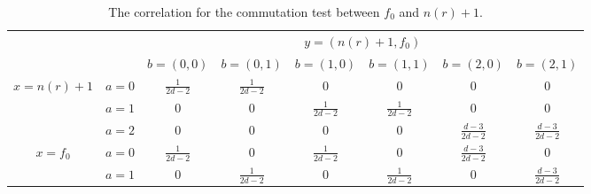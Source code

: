 \documentclass[11pt,letterpaper]{article}
\newcommand{\1}{\mathbb{1}}
\newcommand{\nr}{n(r)}
\theoremstyle{definition}
\begin{document}
\begin{table}[H]
\begin{center}
\begin{tabular}{|c|c||c|c|c|c|c|c|}
\hline
\multicolumn{2}{|c|}{} &
\multicolumn{6}{|c|}{$y=(\nr+1, f_0)$}\\
\cline{3-8}
\multicolumn{2}{|c|}{} &
$b = (0,0)$ & $b=(0,1)$ & 
$b = (1,0)$ & $b=(1,1)$ &
$b = (2,0)$ & $b=(2,1)$   \\
\hline
\hline
\multirow{3}{*}{$x = \nr+1$} & $a=0$ & $\frac{1}{2d-2}$ & $\frac{1}{2d-2}$ &  $0$
& $0$ & $0$ & $0$  \\
\cline{2-8}
&$a=1$ & $0$ & $0 $ & $\frac{1}{2d-2}$ 
&  $\frac{1}{2d-2}$ & $0$ & $0$  \\
\cline{2-8}
&$a=2$ & 0 & 0 & $0$ 
&  0 & $\frac{d-3}{2d-2}$ & $\frac{d-3}{2d-2} $  \\
\hline
\multirow{2}{*}{$x = f_0$} & $a=0$ & $\frac{1}{2d-2}$ & $0$ & $\frac{1}{2d-2}$ 
& $0$ & $\frac{d-3}{2d-2}$ & 0  \\
\cline{2-8}
&$a=1$ & $0$ & $\frac{1}{2d-2}$ & $0$ 
&  $\frac{1}{2d-2}$ & $0$ & $\frac{d-3}{2d-2}$  \\
\hline
\end{tabular}
\end{center}
\caption{The correlation for the commutation test between $f_0$ and $\nr+1$.}
\label{tbl:comm}
\end{table}
\end{document}
